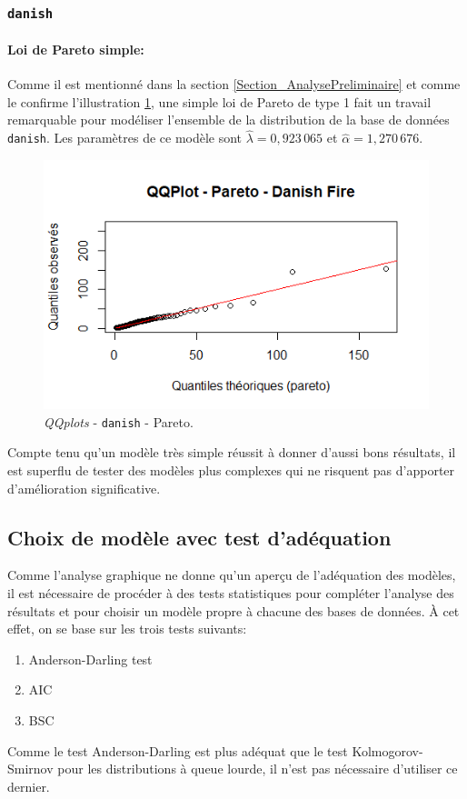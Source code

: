 	\subsubsection{\texttt{danish}}
		\paragraph{Loi de Pareto simple:}
		Comme il est mentionné dans la section \ref{Section_AnalysePreliminaire} et comme le confirme l'illustration \ref{QQplot_Par_t_Danish}, une simple loi de Pareto de type 1 fait un travail remarquable pour modéliser l'ensemble de la distribution de la base de données \texttt{danish}. Les paramètres de ce modèle sont $\hat{\lambda} =0,923\,065$ et $\hat{\alpha} =1,270\,676$.
		\begin{figure}[H]
			\centering
			\includegraphics[scale=0.70]{Graphiques/QQ_Pa_Danish}  
			\renewcommand{\figurename}{Illustration}
			\caption{\textit{QQplots} - \texttt{danish} - Pareto.} \label{QQplot_Par_t_Danish}
		\end{figure}

		Compte tenu qu'un modèle très simple réussit à donner d'aussi bons résultats, il est superflu de tester des modèles plus complexes qui ne risquent pas d'apporter d'amélioration significative.
			
	\subsection{Choix de modèle avec test d'adéquation}\label{Sect_Test_Adequation}
		Comme l'analyse graphique ne donne qu'un aperçu de l'adéquation des modèles, il est nécessaire de procéder à des tests statistiques pour compléter l'analyse des résultats et pour choisir un modèle propre à chacune des bases de données. À cet effet, on se base sur les trois tests suivants:
		\begin{enumerate}
			\item Anderson-Darling test
			\item AIC
			\item BSC
		\end{enumerate}  
		Comme le test Anderson-Darling est plus adéquat que le test Kolmogorov-Smirnov pour les distributions à queue lourde, il n'est pas nécessaire d'utiliser ce dernier. 
		
